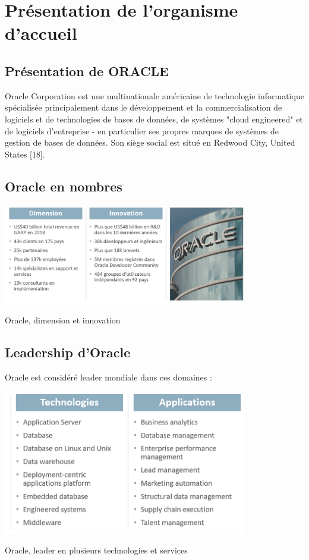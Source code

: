 \section{Présentation de l’organisme d’accueil}
\subsection{Présentation de ORACLE}
Oracle Corporation est une multinationale américaine de technologie informatique spécialisée principalement dans le développement et la commercialisation de logiciels et de technologies de bases de données, de systèmes "cloud engineered" et de logiciels d'entreprise - en particulier ses propres marques de systèmes de gestion de bases de données. Son siège social est situé en Redwood City, United States [18].

\subsection{Oracle en nombres}
\begin{table}[h!]  
  \centering
    \includegraphics[width=0.8\textwidth]{chapitre1/Figures/OracleNumbers.PNG}
  \caption{Oracle, dimension et innovation}
\end{table}

\subsection{Leadership d'Oracle}
Oracle est considéré leader mondiale dans ces domaines :
\begin{table}[h!]  
  \centering
    \includegraphics[width=0.8\textwidth]{chapitre1/Figures/OrcaleTechnos.PNG}
  \caption{Oracle, leader en plusieurs technologies et services}
\end{table}

